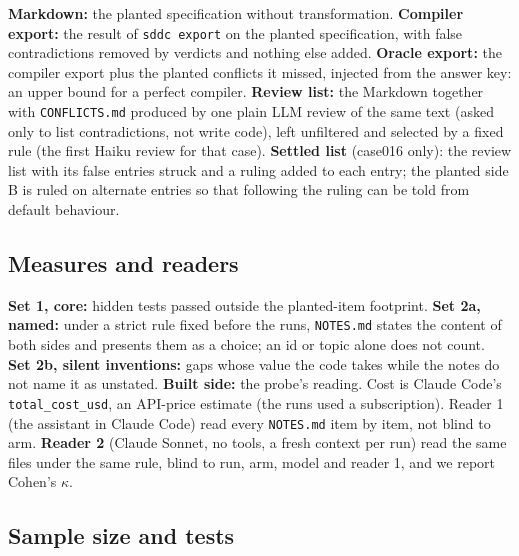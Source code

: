 \documentclass{article}
\newcommand{\code}[1]{\texttt{#1}}
\begin{document}
\textbf{Markdown:} the planted specification without transformation. \textbf{Compiler export:} the result of \code{sddc export} on the planted specification, with false contradictions removed by verdicts and nothing else added. \textbf{Oracle export:} the
compiler export plus the planted conflicts it missed, injected from the answer key: an upper bound for a
perfect compiler. \textbf{Review list:} the Markdown together with \code{CONFLICTS.md} produced by one plain LLM review of the same text (asked only to list contradictions, not write code), left unfiltered and selected by a fixed rule (the first Haiku review for that case).
\textbf{Settled list} (case016 only): the review list with its false entries struck and a ruling added to
each entry; the planted side B is ruled on alternate entries so that following the ruling can be told from
default behaviour.

\subsection{Measures and readers}

\textbf{Set 1, core:} hidden tests passed outside the planted-item footprint. \textbf{Set 2a, named:} under a strict rule
fixed before the runs, \code{NOTES.md} states the content of both sides and presents them as a choice; an id
or topic alone does not count. \textbf{Set 2b, silent inventions:} gaps whose value the code takes while the
notes do not name it as unstated. \textbf{Built side:} the probe's reading. Cost is Claude Code's
\code{total\_cost\_usd}, an API-price estimate (the runs used a subscription). Reader 1 (the assistant in
Claude Code) read every \code{NOTES.md} item by item, not blind to arm. \textbf{Reader 2} (Claude Sonnet, no
tools, a fresh context per run) read the same files under the same rule, blind to run, arm, model and
reader 1, and we report Cohen's $\kappa$.

\subsection{Sample size and tests}\label{sec:stats}
\end{document}

